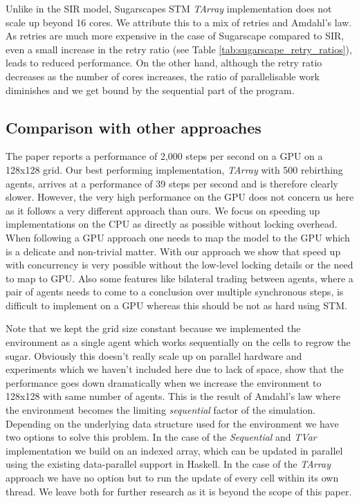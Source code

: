 Unlike in the SIR model, Sugarscapes STM \textit{TArray} implementation does not scale up beyond 16 cores. We attribute this to a mix of retries and Amdahl's law. As retries are much more expensive in the case of Sugarscape compared to SIR, even a small increase in the retry ratio (see Table \ref{tab:sugarscape_retry_ratios}), leads to reduced performance. On the other hand, although the retry ratio decreases as the number of cores increases, the ratio of parallelisable work diminishes and we get bound by the sequential part of the program.

\subsection{Comparison with other approaches}
The paper \cite{lysenko_framework_2008} reports a performance of 2,000 steps per second on a GPU on a 128x128 grid. Our best performing implementation, \textit{TArray} with 500 rebirthing agents, arrives at a performance of 39 steps per second and is therefore clearly slower. However, the very high performance on the GPU does not concern us here as it follows a very different approach than ours. We focus on speeding up implementations on the CPU as directly as possible without locking overhead. When following a GPU approach one needs to map the model to the GPU which is a delicate and non-trivial matter. With our approach we show that speed up with concurrency is very possible without the low-level locking details or the need to map to GPU. Also some features like bilateral trading between agents, where a pair of agents needs to come to a conclusion over multiple synchronous steps, is difficult to implement on a GPU whereas this should be not as hard using STM.

Note that we kept the grid size constant because we implemented the environment as a single agent which works sequentially on the cells to regrow the sugar. Obviously this doesn't really scale up on parallel hardware and experiments which we haven't included here due to lack of space, show that the performance goes down dramatically when we increase the environment to 128x128 with same number of agents. This is the result of Amdahl's law where the environment becomes the limiting \textit{sequential} factor of the simulation. Depending on the underlying data structure used for the environment we have two options to solve this problem. In the case of the \textit{Sequential} and \textit{TVar} implementation we build on an indexed array, which can be updated in parallel using the existing data-parallel support in Haskell. In the case of the \textit{TArray} approach we have no option but to run the update of every cell within its own thread. We leave both for further research as it is beyond the scope of this paper.

